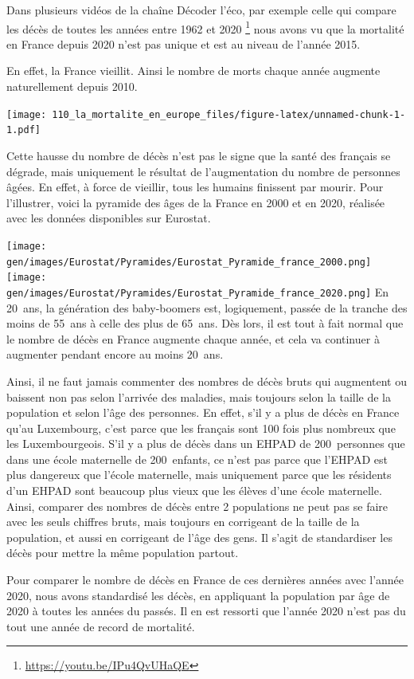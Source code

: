 \documentclass[
]{article}
\begin{document}
Dans plusieurs vidéos de la chaîne Décoder l'éco, par exemple celle qui
compare les décès de toutes les années entre 1962 et 2020 \footnote{\url{https://youtu.be/IPu4QvUHaQE}}
nous avons vu que la mortalité en France depuis 2020 n'est pas unique et
est au niveau de l'année 2015.

En effet, la France vieillit. Ainsi le nombre de morts chaque année
augmente naturellement depuis 2010.

\texttt{[image: 110\_la\_mortalite\_en\_europe\_files/figure-latex/unnamed-chunk-1-1.pdf]}

Cette hausse du nombre de décès n'est pas le signe que la santé des
français se dégrade, mais uniquement le résultat de l'augmentation du
nombre de personnes âgées. En effet, à force de vieillir, tous les
humains finissent par mourir. Pour l'illustrer, voici la pyramide des
âges de la France en 2000 et en 2020, réalisée avec les données
disponibles sur Eurostat.

\texttt{[image: gen/images/Eurostat/Pyramides/Eurostat\_Pyramide\_france\_2000.png]}
\texttt{[image: gen/images/Eurostat/Pyramides/Eurostat\_Pyramide\_france\_2020.png]}
En 20~ans, la génération des baby-boomers est, logiquement, passée de la
tranche des moins de 55~ans à celle des plus de 65~ans. Dès lors, il est
tout à fait normal que le nombre de décès en France augmente chaque
année, et cela va continuer à augmenter pendant encore au moins 20~ans.

Ainsi, il ne faut jamais commenter des nombres de décès bruts qui
augmentent ou baissent non pas selon l'arrivée des maladies, mais
toujours selon la taille de la population et selon l'âge des personnes.
En effet, s'il y a plus de décès en France qu'au Luxembourg, c'est parce
que les français sont 100 fois plus nombreux que les Luxembourgeois.
S'il y a plus de décès dans un EHPAD de 200~personnes que dans une école
maternelle de 200~enfants, ce n'est pas parce que l'EHPAD est plus
dangereux que l'école maternelle, mais uniquement parce que les
résidents d'un EHPAD sont beaucoup plus vieux que les élèves d'une école
maternelle. Ainsi, comparer des nombres de décès entre 2 populations ne
peut pas se faire avec les seuls chiffres bruts, mais toujours en
corrigeant de la taille de la population, et aussi en corrigeant de
l'âge des gens. Il s'agit de standardiser les décès pour mettre la même
population partout.

Pour comparer le nombre de décès en France de ces dernières années avec
l'année 2020, nous avons standardisé les décès, en appliquant la
population par âge de 2020 à toutes les années du passés. Il en est
ressorti que l'année 2020 n'est pas du tout une année de record de
mortalité.
\end{document}

